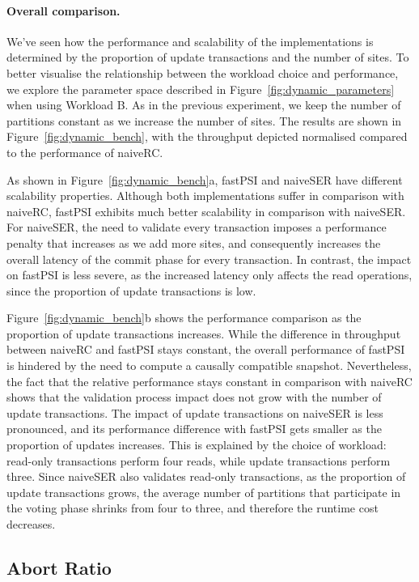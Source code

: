 \paragraph{Overall comparison.} We've seen how the performance and scalability of the implementations is determined by the proportion of update transactions and the number of sites. To better visualise the relationship between the workload choice and performance, we explore the parameter space described in Figure~\ref{fig:dynamic_parameters} when using Workload B. As in the previous experiment, we keep the number of partitions constant as we increase the number of sites. The results are shown in Figure~\ref{fig:dynamic_bench}, with the throughput depicted normalised compared to the performance of naiveRC.

As shown in Figure~\ref{fig:dynamic_bench}a, fastPSI and naiveSER have different scalability properties. Although both implementations suffer in comparison with naiveRC, fastPSI exhibits much better scalability in comparison with naiveSER. For naiveSER, the need to validate every transaction imposes a performance penalty that increases as we add more sites, and consequently increases the overall latency of the commit phase for every transaction. In contrast, the impact on fastPSI is less severe, as the increased latency only affects the read operations, since the proportion of update transactions is low.

Figure~\ref{fig:dynamic_bench}b shows the performance comparison as the proportion of update transactions increases. While the difference in throughput between naiveRC and fastPSI stays constant, the overall performance of fastPSI is hindered by the need to compute a causally compatible snapshot. Nevertheless, the fact that the relative performance stays constant in comparison with naiveRC shows that the validation process impact does not grow with the number of update transactions. The impact of update transactions on naiveSER is less pronounced, and its performance difference with fastPSI gets smaller as the proportion of updates increases. This is explained by the choice of workload: read-only transactions perform four reads, while update transactions perform three. Since naiveSER also validates read-only transactions, as the proportion of update transactions grows, the average number of partitions that participate in the voting phase shrinks from four to three, and therefore the runtime cost decreases.

\subsection{Abort Ratio}

